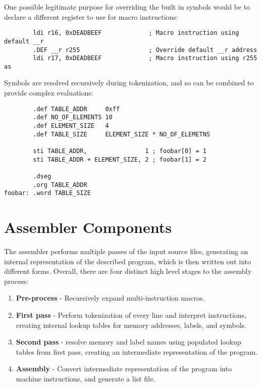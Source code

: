 \documentclass[12pt,twoside]{report}
\begin{document}
One possible legitimate purpose for overriding the built in symbols
would be to declare a different register to use for macro
instructions:

\begin{verbatim}
        ldi r16, 0xDEADBEEF             ; Macro instruction using default __r
        .DEF __r r255                   ; Override default __r address
        ldi r17, 0xDEADBEEF             ; Macro instruction using r255 as
\end{verbatim}

Symbols are resolved recursively during tokenization, and so can be
combined to provide complex evaluations:

\begin{verbatim}
        .def TABLE_ADDR     0xff
        .def NO_OF_ELEMENTS 10
        .def ELEMENT_SIZE   4
        .def TABLE_SIZE     ELEMENT_SIZE * NO_OF_ELEMETNS

        sti TABLE_ADDR,                1 ; foobar[0] = 1
        sti TABLE_ADDR + ELEMENT_SIZE, 2 ; foobar[1] = 2

        .dseg
        .org TABLE_ADDR
foobar: .word TABLE_SIZE
\end{verbatim}

\chapter{Assembler Components}

The assembler performs multiple passes of the input source files,
generating an internal representation of the described program, which
is then written out into different forms. Overall, there are four
distinct high level stages to the assembly process:

\begin{enumerate}
\item \textbf{Pre-process} - Recursively expand multi-instruction macros.
\item \textbf{First pass} - Perform tokenization of every line and
  interpret instructions, creating internal lookup tables for memory
  addresses, labels, and symbols.
\item \textbf{Second pass} - resolve memory and label names using
  populated lookup tables from first pass, creating an intermediate
  representation of the program.
\item \textbf{Assembly} - Convert intermediate representation of the
  program into machine instructions, and generate a list file.
\end{enumerate}
\end{document}
